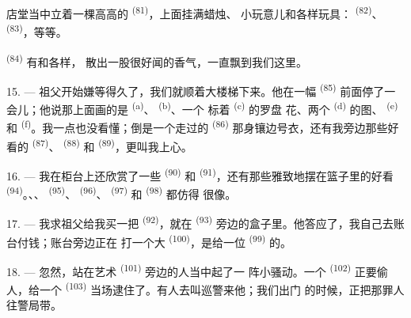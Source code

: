店堂当中立着一棵高高的 \textsuperscript{(81)}，上面挂满蜡烛、
小玩意儿和各样玩具： \textsuperscript{(82)}、
\textsuperscript{(83)}，等等。

 \textsuperscript{(84)} 有和各样，
散出一股很好闻的香气，一直飘到我们这里。

\VUsaut{3.4mm}
\VUsaut{2.8mm}

15. --- 祖父开始嫌等得久了，我们就顺着大楼梯下来。他在一幅
 \textsuperscript{(85)} 前面停了一会儿；他说那上面画的是
 \textsuperscript{(a)}、 \textsuperscript{(b)}、一个
标着 \textsuperscript{(c)} 的罗盘
花、两个 \textsuperscript{(d)} 的图、 \textsuperscript{(e)}
和 \textsuperscript{(f)}。我一点也没看懂；倒是一个走过的
 \textsuperscript{(86)} 那身镶边号衣，还有我旁边那些好看的
 \textsuperscript{(87)}、 \textsuperscript{(88)} 和
 \textsuperscript{(89)}，更叫我上心。

16. --- 我在柜台上还欣赏了一些 \textsuperscript{(90)} 和
 \textsuperscript{(91)}，还有那些雅致地摆在篮子里的好看
 \textsuperscript{(94)}。、、
 \textsuperscript{(95)}、 \textsuperscript{(96)}、
 \textsuperscript{(97)} 和 \textsuperscript{(98)} 都仿得
很像。

\VUsaut{4.4mm}
\VUsaut{2.8mm}

17. --- 我求祖父给我买一把 \textsuperscript{(92)}，就在
\textsuperscript{(93)} 旁边的盒子里。他答应了，我自己去账台付钱；账台旁边正在
打一个大 \textsuperscript{(100)}，是给一位
\textsuperscript{(99)} 的。

18. --- 忽然，站在艺术 \textsuperscript{(101)} 旁边的人当中起了一
阵小骚动。一个 \textsuperscript{(102)} 正要偷人，给一个
 \textsuperscript{(103)} 当场逮住了。有人去叫巡警来他；我们出门
的时候，正把那罪人往警局带。
\VUsaut{6.0mm}
\VUfilet{22mm}

